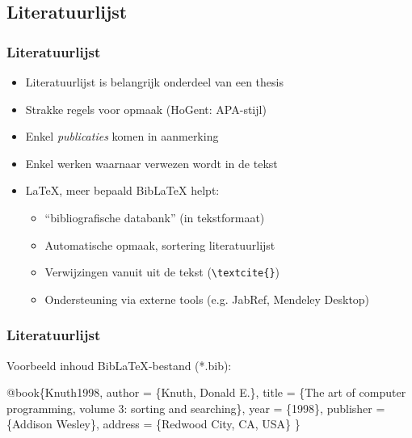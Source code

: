\documentclass[aspectratio=169]{beamer}
\begin{document}
\subsection{Literatuurlijst}

\begin{frame}[fragile]
  \frametitle{Literatuurlijst}
  
  \begin{itemize}
  \item<+-> Literatuurlijst is belangrijk onderdeel van een thesis
  \item<+-> Strakke regels voor opmaak (HoGent: APA-stijl)
  \item<+-> Enkel \emph{publicaties} komen in aanmerking
  \item<+-> Enkel werken waarnaar verwezen wordt in de tekst
  \item<+-> {\LaTeX}, meer bepaald Bib{\LaTeX} helpt:
    \begin{itemize}
    \item<+-> ``bibliografische databank'' (in tekstformaat)
    \item<+-> Automatische opmaak, sortering literatuurlijst
    \item<+-> Verwijzingen vanuit uit de tekst (\verb|\textcite{}|)
    \item<+-> Ondersteuning via externe tools (e.g. JabRef, Mendeley Desktop)
    \end{itemize} 
  \end{itemize}
\end{frame}

\begin{frame}[fragile]
  \frametitle{Literatuurlijst}

Voorbeeld inhoud Bib{\LaTeX}-bestand (*.bib):

\begin{semiverbatim}
\alert<2>{@book}\{\alert<4>{Knuth1998},
 \alert<3>{author} = \{Knuth, Donald E.\},
 \alert<3>{title} = \{The art of computer programming,  volume 3:
   sorting and searching\},
 \alert<3>{year} = \{1998\},
 publisher = \{Addison Wesley\},
 address = \{Redwood City, CA, USA\}
\} 
\end{semiverbatim}


\end{frame}
\end{document}
